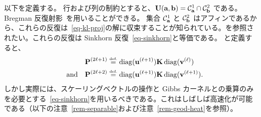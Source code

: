 \begin{rem}[反復射影との関係]\label{rem-iterative-projection}
以下を定義する。
行および列の制約とすると、$\CouplingsD(\a,\b) = \Cc^1_\a \cap \Cc^2_\b$ である。Bregman 反復射影~\citep{bregman1967relaxation}を用いることができる。
集合 $\Cc^1_\a$ と $\Cc^2_\b$ はアフィンであるから、これらの反復は~\eqref{eq-kl-proj}の解に収束することが知られている。\citep{bregman1967relaxation}を参照されたい。これらの反復は Sinkhorn 反復~\eqref{eq-sinkhorn}と等価である。
\eq{\label{eq-sink-matrix}\P^{(2\ell)} \eqdef \diag(\it{\uD}) \K \diag(\it{\vD}),}
と定義すると、
\begin{align*}
	\P^{(2\ell+1)} &\eqdef \diag(\itt{\uD}) \K \diag(\it{\vD}) \\
	\qandq
	\P^{(2\ell+2)} &\eqdef \diag(\itt{\uD}) \K \diag(\itt{\vD}).
\end{align*}
しかし実際には、スケーリングベクトルの操作と Gibbs カーネルとの乗算のみを必要とする~\eqref{eq-sinkhorn}を用いるべきである。これはしばしば高速化が可能である（以下の注意~\ref{rem-separable}および注意~\ref{rem-geod-heat}を参照）。
\end{rem}

